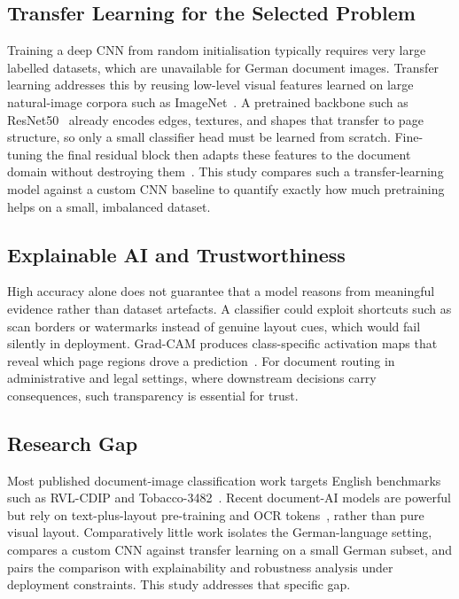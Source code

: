 \documentclass[preprint,12pt]{elsarticle}
\begin{document}
\subsection{Transfer Learning for the Selected Problem}
Training a deep CNN from random initialisation typically requires very large
labelled datasets, which are unavailable for German document images.
Transfer learning addresses this by reusing low-level visual features learned on
large natural-image corpora such as ImageNet~\cite{deng2009imagenet,russakovsky2015imagenet}.
A pretrained backbone such as ResNet50~\cite{he2016deep} already encodes edges,
textures, and shapes that transfer to page structure, so only a small classifier
head must be learned from scratch.
Fine-tuning the final residual block then adapts these features to the document
domain without destroying them~\cite{weiss2016survey}.
This study compares such a transfer-learning model against a custom CNN baseline
to quantify exactly how much pretraining helps on a small, imbalanced dataset.

\subsection{Explainable AI and Trustworthiness}
High accuracy alone does not guarantee that a model reasons from meaningful
evidence rather than dataset artefacts.
A classifier could exploit shortcuts such as scan borders or watermarks instead
of genuine layout cues, which would fail silently in deployment.
Grad-CAM produces class-specific activation maps that reveal which page regions
drove a prediction~\cite{selvaraju2017grad}.
For document routing in administrative and legal settings, where downstream
decisions carry consequences, such transparency is essential for trust.

\subsection{Research Gap}
Most published document-image classification work targets English benchmarks
such as RVL-CDIP and Tobacco-3482~\cite{harley2015evaluation,afzal2017cutting}.
Recent document-AI models are powerful but rely on text-plus-layout
pre-training and OCR tokens~\cite{xu2020layoutlm,huang2022layoutlmv3,kim2022donut},
rather than pure visual layout.
Comparatively little work isolates the German-language setting, compares a custom
CNN against transfer learning on a small German subset, and pairs the comparison
with explainability and robustness analysis under deployment constraints.
This study addresses that specific gap.
\end{document}
